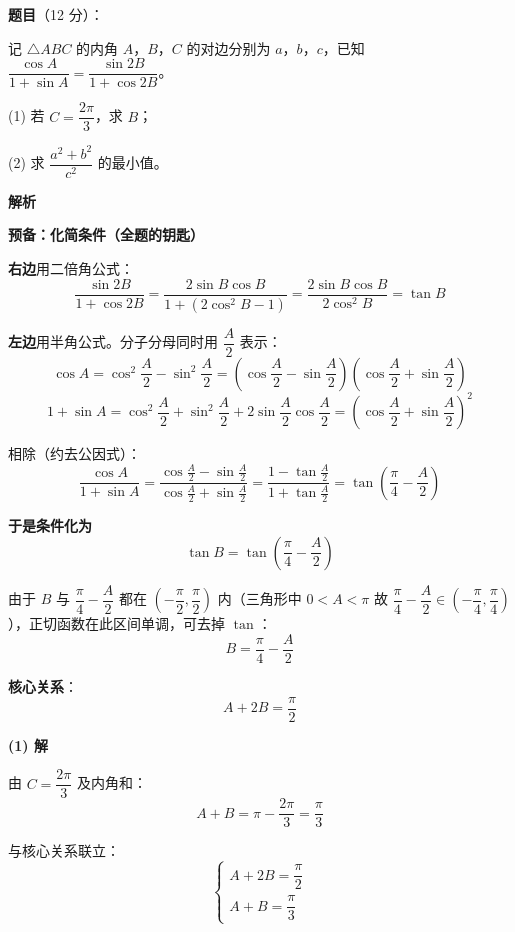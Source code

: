 \begin{answer}

\textbf{题目}（12 分）：

记 $\triangle ABC$ 的内角 $A$，$B$，$C$ 的对边分别为 $a$，$b$，$c$，已知 $\dfrac{\cos A}{1+\sin A}=\dfrac{\sin2B}{1+\cos2B}$。

  (1) 若 $C=\dfrac{2\pi}3$，求 $B$；

  (2) 求 $\dfrac{a^{2}+b^{2}}{c^{2}}$ 的最小值。

\textbf{解析}

\par\medskip

\textbf{预备：化简条件（全题的钥匙）}

\textbf{右边}用二倍角公式：
\nopagebreak[4]
\[\frac{\sin2B}{1+\cos2B}=\frac{2\sin B\cos B}{1+\left(2\cos^{2}B-1\right)}=\frac{2\sin B\cos B}{2\cos^{2}B}=\tan B\]

\textbf{左边}用半角公式。分子分母同时用 $\dfrac A2$ 表示：
\nopagebreak[4]
\[\cos A=\cos^{2}\frac A2-\sin^{2}\frac A2=\left(\cos\frac A2-\sin\frac A2\right)\left(\cos\frac A2+\sin\frac A2\right)\]
\nopagebreak[4]
\[1+\sin A=\cos^{2}\frac A2+\sin^{2}\frac A2+2\sin\frac A2\cos\frac A2=\left(\cos\frac A2+\sin\frac A2\right)^{2}\]

相除（约去公因式）：
\nopagebreak[4]
\[\frac{\cos A}{1+\sin A}=\frac{\cos\frac A2-\sin\frac A2}{\cos\frac A2+\sin\frac A2}=\frac{1-\tan\frac A2}{1+\tan\frac A2}=\tan\left(\frac\pi4-\frac A2\right)\]

\textbf{于是条件化为}
\nopagebreak[4]
\[\tan B=\tan\left(\frac\pi4-\frac A2\right)\]

由于 $B$ 与 $\dfrac\pi4-\dfrac A2$ 都在 $\left(-\dfrac\pi2,\dfrac\pi2\right)$ 内（三角形中 $0<A<\pi$ 故 $\dfrac\pi4-\dfrac A2\in\left(-\dfrac\pi4,\dfrac\pi4\right)$），正切函数在此区间单调，可去掉 $\tan$：
\nopagebreak[4]
\[B=\frac\pi4-\frac A2\]

\textbf{核心关系}：
\nopagebreak[4]
\[\boxed{A+2B=\frac\pi2}\]

\par\medskip

\textbf{(1) 解}

由 $C=\dfrac{2\pi}3$ 及内角和：
\nopagebreak[4]
\[A+B=\pi-\frac{2\pi}3=\frac\pi3\]

与核心关系联立：
\nopagebreak[4]
\[\begin{cases}A+2B=\dfrac\pi2\\ A+B=\dfrac\pi3\end{cases}\]


\end{answer}

